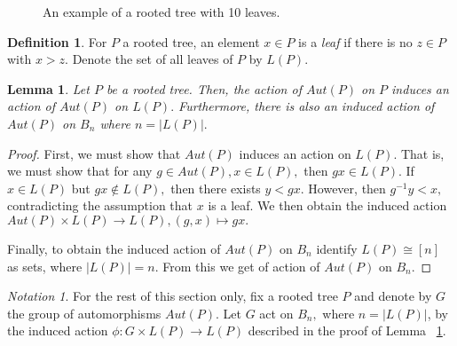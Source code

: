 \documentclass[10 pt]{amsart}
\theoremstyle{plain}
\newtheorem{lem}[thm]{Lemma}
\theoremstyle{definition}
\newtheorem{defn}[thm]{Definition}
\theoremstyle{remark}
\newtheorem{note}[thm]{Notation}
\numberwithin{equation}{section}
\begin{document}
\begin{figure}[h!]
\caption{\label{fig:tree2} An example of a rooted tree with 10  leaves.}
\end{figure}

\begin{defn}
For $P$ a rooted tree, an element $x \in P$ is a {\it leaf} if there is no $z \in P$ with $x > z.$ Denote the set of all leaves of $P$ by $L(P).$
\end{defn}

\begin{lem}
\label{lem:induced_tree_action}
Let $P$ be a rooted tree. Then, the action of $Aut(P)$ on $P$ induces an action of $Aut(P)$ on $L(P).$ Furthermore, there is also an induced action of $Aut(P)$ on $B_n$ where $n = |L(P)|.$ 
\end{lem}
\begin{proof}
First, we must show that $Aut(P)$ induces an action on $L(P).$ That is, we must show that for any $g \in Aut(P),x \in L(P),$ then $gx \in L(P).$ If $x \in L(P)$ but $gx \notin L(P),$ then there exists $y < gx.$ However, then $g^{-1}y < x,$ contradicting the assumption that $x$ is a leaf. We then obtain the induced action $Aut(P)\times L(P) \rightarrow L(P),(g,x)\mapsto gx.$

Finally, to obtain the induced action of $Aut(P)$ on $B_n$ identify $L(P) \cong [n]$ as sets, where $|L(P)| = n$. From this we get of action of $Aut(P)$ on $B_n.$
\end{proof}

\begin{note}
For the rest of this section only, fix a rooted tree $P$ and denote by $G$ the group of automorphisms $Aut(P).$ Let $G$ act on $B_n,$ where $n = |L(P)|$, by the induced action $\phi:G \times L(P) \rightarrow L(P)$ described in the proof of Lemma ~\ref{lem:induced_tree_action}.
\end{note}
\end{document}
